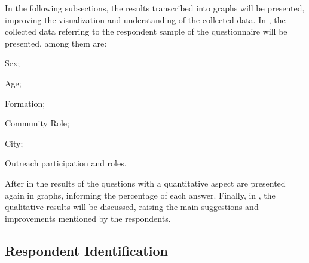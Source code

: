 
In the following subsections, the results transcribed into graphs will be presented, improving the visualization and understanding of the collected data. In , the collected data referring to the respondent sample of the questionnaire will be presented, among them are:
\begin{inparaenum}[(1)]
  \item Sex;
  \item Age;
  \item Formation;
  \item Community Role;
  \item City;
  \item Outreach participation and roles.
\end{inparaenum}
After in  the results of the questions with a quantitative aspect are presented again in graphs, informing the percentage of each answer. Finally, in , the qualitative results will be discussed, raising the main suggestions and improvements mentioned by the respondents.

\subsection{Respondent Identification}\label{sec:participant-identification} %


